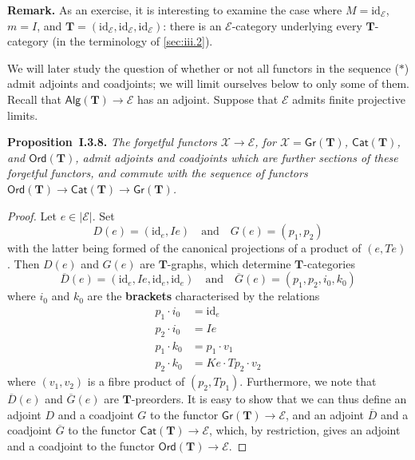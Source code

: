 \documentclass[fleqn]{article}
\newenvironment{itenv}[1]
  {\phantomsection\par\medskip\noindent\textbf{#1.}\itshape}
  {\par\medskip}
\newenvironment{rmenv}[1]
  {\phantomsection\par\medskip\noindent\textbf{#1.}\rmfamily}
  {\par\medskip}
\newcommand{\unsure}[1]{{\color{purple}\textbf{#1}}}
\newcommand{\id}{\mathrm{id}}
\newcommand{\TT}{\mathbf{T}}
\newcommand{\textand}{\quad\text{and}\quad}
\newcommand{\cat}[1]{\mathcal{#1}}
\newcommand{\Cat}[1]{\mathsf{#1}}
\newcommand{\set}[1]{|#1|}
\newcommand{\Gr}[1]{\Cat{Gr}(#1)}
\newcommand{\Alg}[1]{\Cat{Alg}(#1)}
\newcommand{\Ord}[1]{\Cat{Ord}(#1)}
\begin{document}
\begin{rmenv}{Remark}
  As an exercise, it is interesting to examine the case where $M=\id_\cat{E}$, $m=I$, and $\TT=(\id_\cat{E},\id_\cat{E},\id_\cat{E})$: there is an $\cat{E}$-category underlying every $\TT$-category (in the terminology of \cref{sec:iii.2}).
\end{rmenv}

We will later study the question of whether or not all functors in the sequence ($\ast$) admit adjoints and coadjoints;
we will limit ourselves below to only some of them.
Recall that $\Alg{\TT}\to\cat{E}$ has an adjoint.
Suppose that $\cat{E}$ admits finite projective limits.

\begin{itenv}{Proposition~I.3.8}
  The forgetful functors $\cat{X}\to\cat{E}$, for $\cat{X}=\Gr{\TT}$, $\Cat{Cat}(\TT)$, and $\Ord{\TT}$, admit adjoints and coadjoints which are further sections of these forgetful functors, and commute with the sequence of functors $\Ord{\TT}\to\Cat{Cat}(\TT)\to\Gr{\TT}$.
\end{itenv}

\begin{proof}
  Let $e\in\set{\cat{E}}$.
  Set
  \[
    D(e) = (\id_e,Ie)
    \textand
    G(e) = (p_1,p_2)
  \]
  with the latter being formed of the canonical projections of a product of $(e,Te)$.
  Then $D(e)$ and $G(e)$ are $\TT$-graphs, which determine $\TT$-categories
  \[
    \overline{D}(e) = (\id_e,Ie,\id_e,\id_e)
    \textand
    \overline{G}(e) = (p_1,p_2,i_0,k_0)
  \]
  where $i_0$ and $k_0$ are the \unsure{brackets} characterised by the relations
  \[
    \begin{aligned}
      p_1\cdot i_0
    & = \id_e
    \\p_2\cdot i_0
    & = Ie
    \\p_1\cdot k_0
    & = p_1\cdot v_1
    \\p_2\cdot k_0
    & = Ke\cdot Tp_2\cdot v_2
    \end{aligned}
  \]
  where $(v_1,v_2)$ is a fibre product of $(p_2,Tp_1)$.
  Furthermore, we note that $\overline{D}(e)$ and $\overline{G}(e)$ are $\TT$-preorders.
  It is easy to show that we can thus define an adjoint $D$ and a coadjoint $G$ to the functor $\Gr{\TT}\to\cat{E}$, and an adjoint $\overline{D}$ and a coadjoint $\overline{G}$ to the functor $\Cat{Cat}(\TT)\to\cat{E}$, which, by restriction, gives an adjoint and a coadjoint to the functor $\Ord{\TT}\to\cat{E}$.
\end{proof}
\end{document}
